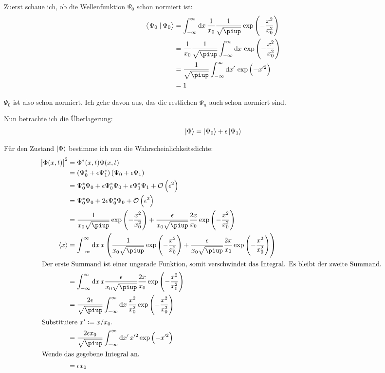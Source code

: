 Zuerst schaue ich, ob die Wellenfunktion $\Psi_0$ schon normiert ist:
\begin{align*}
	\braket{\Psi_0}{\Psi_0}
	&= \int_{-\infty}^\infty \dif x \, \frac{1}{x_0} \frac{1}{\sqrt\piup} \exp\del{-\frac{x^2}{x_0^2}} \\
	&= \frac{1}{x_0} \frac{1}{\sqrt\piup} \int_{-\infty}^\infty \dif x \, \exp\del{-\frac{x^2}{x_0^2}} \\
	&= \frac{1}{\sqrt\piup} \int_{-\infty}^\infty \dif x' \, \exp\del{-x'^2} \\
	&= 1
\end{align*}

$\Psi_0$ ist also schon normiert. Ich gehe davon aus, das die restlichen
$\Psi_n$ auch schon normiert sind.

Nun betrachte ich die Überlagerung:
\[
	\left| \Phi \right\rangle = \left| \Psi_0 \right\rangle + \epsilon \left| \Psi_1 \right\rangle
\]

Für den Zustand $\left| \Phi \right\rangle$ bestimme ich nun die Wahrscheinlichkeitsdichte:
\begin{align*}
	\abs{\Phi(x, t)}^2
	&= \Phi^*(x, t) \Phi(x, t) \\
	&= \del{\Psi_0^* + \epsilon \Psi_1^*} \del{\Psi_0 + \epsilon \Psi_1} \\
	&= \Psi_0^* \Psi_0 + \epsilon \Psi_0^* \Psi_0 + \epsilon \Psi_1^* \Psi_1 + \mathcal O\del{\epsilon^2} \\
	&= \Psi_0^* \Psi_0 + 2 \epsilon \Psi_0^* \Psi_0 + \mathcal O\del{\epsilon^2} \\
	&= \frac{1}{x_0 \sqrt\piup} \exp\del{-\frac{x^2}{x_0^2}} + \frac{\epsilon}{x_0\sqrt\piup} \frac{2x}{x_0} \exp\del{-\frac{x^2}{x_0^2}} \\
	\bracket x
	&= \int_{-\infty}^\infty \dif x \, x \del{\frac{1}{x_0 \sqrt\piup} \exp\del{-\frac{x^2}{x_0^2}} + \frac{\epsilon}{x_0\sqrt\piup} \frac{2x}{x_0} \exp\del{-\frac{x^2}{x_0^2}}} \\
	\intertext{%
		Der erste Summand ist einer ungerade Funktion, somit verschwindet das
		Integral. Es bleibt der zweite Summand.
	}
	&= \int_{-\infty}^\infty \dif x \, x \frac{\epsilon}{x_0\sqrt\piup} \frac{2x}{x_0} \exp\del{-\frac{x^2}{x_0^2}} \\
	&= \frac{2\epsilon}{\sqrt\piup} \int_{-\infty}^\infty \dif x \, \frac{x^2}{x_0^2} \exp\del{-\frac{x^2}{x_0^2}} \\
	\intertext{%
		Substituiere $x' := x/x_0$.
	}
	&= \frac{2\epsilon x_0}{\sqrt\piup} \int_{-\infty}^\infty \dif x' \, x'^2 \exp\del{-x'^2} \\
	\intertext{%
		Wende das gegebene Integral an.
	}
	&= \epsilon x_0
\end{align*}

